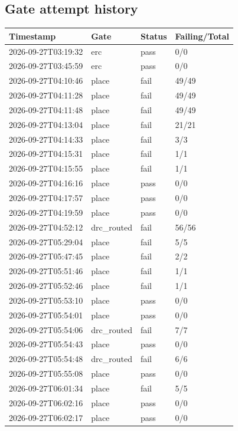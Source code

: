 \documentclass[11pt,a4paper]{article}
\begin{document}
\subsection*{Gate attempt history}
{\small
\begin{longtable}{llll}
\toprule
\textbf{Timestamp} & \textbf{Gate} & \textbf{Status} & \textbf{Failing/Total} \\
\midrule
\endhead
2026-09-27T03:19:32 & erc & pass & 0/0 \\
2026-09-27T03:45:59 & erc & pass & 0/0 \\
2026-09-27T04:10:46 & place & fail & 49/49 \\
2026-09-27T04:11:28 & place & fail & 49/49 \\
2026-09-27T04:11:48 & place & fail & 49/49 \\
2026-09-27T04:13:04 & place & fail & 21/21 \\
2026-09-27T04:14:33 & place & fail & 3/3 \\
2026-09-27T04:15:31 & place & fail & 1/1 \\
2026-09-27T04:15:55 & place & fail & 1/1 \\
2026-09-27T04:16:16 & place & pass & 0/0 \\
2026-09-27T04:17:57 & place & pass & 0/0 \\
2026-09-27T04:19:59 & place & pass & 0/0 \\
2026-09-27T04:52:12 & drc\_routed & fail & 56/56 \\
2026-09-27T05:29:04 & place & fail & 5/5 \\
2026-09-27T05:47:45 & place & fail & 2/2 \\
2026-09-27T05:51:46 & place & fail & 1/1 \\
2026-09-27T05:52:46 & place & fail & 1/1 \\
2026-09-27T05:53:10 & place & pass & 0/0 \\
2026-09-27T05:54:01 & place & pass & 0/0 \\
2026-09-27T05:54:06 & drc\_routed & fail & 7/7 \\
2026-09-27T05:54:43 & place & pass & 0/0 \\
2026-09-27T05:54:48 & drc\_routed & fail & 6/6 \\
2026-09-27T05:55:08 & place & pass & 0/0 \\
2026-09-27T06:01:34 & place & fail & 5/5 \\
2026-09-27T06:02:16 & place & pass & 0/0 \\
2026-09-27T06:02:17 & place & pass & 0/0 \\

\end{longtable}}
\end{document}
